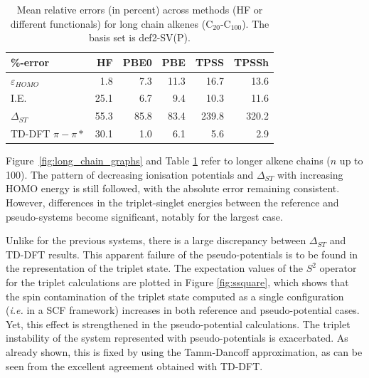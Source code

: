 \documentclass[aip,reprint]{revtex4-1}
\begin{document}
\begin{table}[ht]
\caption{Mean relative errors (in percent) across methods (HF or different functionals)
for long chain alkenes (C\(_{20}\)-C\(_{100}\)).
The basis set is def2-SV(P).}
\begin{tabular}{l r r r r r }
\hline\hline
\%-error          & HF & PBE0 & PBE & TPSS & TPSSh \\
\hline
$\varepsilon_{HOMO}$    &  1.8 &  7.3   &  11.3   &  16.7    &  13.6 \\
I.E.                    & 25.1 &  6.7   &   9.4   &  10.3    &  11.6 \\
$\Delta_{ST}$           & 55.3 & 85.8   &  83.4   & 239.8    & 320.2 \\
TD-DFT $\pi-\pi*$       & 30.1 &  1.0   &   6.1   &   5.6    &   2.9 \\ 
\hline\hline
\end{tabular}
\label{table:long_alkene_errors}
\end{table}

Figure~\ref{fig:long_chain_graphs} and Table \ref{table:long_alkene_errors} refer to longer 
alkene chains (\(n\) up to 100).
The pattern of decreasing ionisation potentials and $\Delta_{ST}$ with increasing HOMO
energy is still followed, with the absolute error remaining consistent.
However, differences in the triplet-singlet energies between the reference and pseudo-systems 
become significant, notably for the largest case.

Unlike for the previous systems, there is a large discrepancy between $\Delta_{ST}$
and TD-DFT results.
This apparent failure of the pseudo-potentials is to be found in the representation
of the triplet state.
The expectation values of the $S^2$ operator for the triplet calculations
are plotted in Figure \ref{fig:ssquare}, which shows that the spin contamination
of the triplet state computed as a single configuration (\emph{i.e.} in a SCF
framework) increases in both reference and pseudo-potential cases.
Yet, this effect is strengthened in the pseudo-potential calculations.
The triplet instability of the system represented with pseudo-potentials
is exacerbated.
As already shown, this is fixed by using the Tamm-Dancoff approximation,
as can be seen from the excellent agreement obtained with TD-DFT.\cite{tammdancoff}
\end{document}
